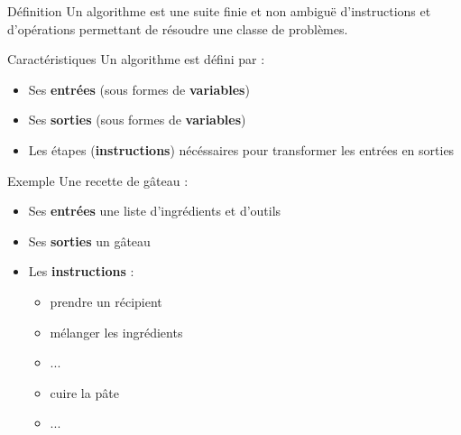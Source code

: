 \begin{frame}{Définition}
    Un algorithme est une suite finie et non ambiguë d'instructions et d’opérations permettant de résoudre une classe de problèmes.
\end{frame}

\begin{frame}{Caractéristiques}
    Un algorithme est défini par :
    \begin{itemize}
        \item Ses \textbf{entrées} (sous formes de \textbf{variables})
        \item Ses \textbf{sorties} (sous formes de \textbf{variables})
        \item Les étapes (\textbf{instructions}) nécéssaires pour transformer les entrées en sorties
    \end{itemize}
\end{frame}

\begin{frame}{Exemple}
    Une recette de gâteau :
    \begin{itemize}
        \item Ses \textbf{entrées} une liste d'ingrédients et d'outils
        \item Ses \textbf{sorties} un gâteau
        \item Les \textbf{instructions} :
        \begin{itemize}
            \item prendre un récipient
            \item mélanger les ingrédients
            \item ...
            \item cuire la pâte
            \item ...
        \end{itemize}    
    \end{itemize}
\end{frame}

